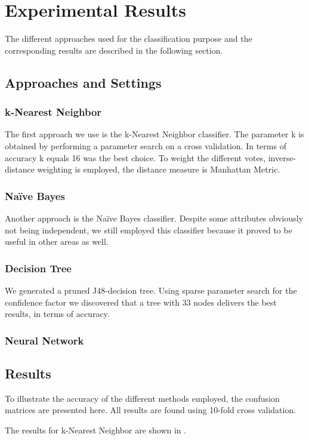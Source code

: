 \section{Experimental Results}
The different approaches used for the classification purpose and the corresponding results are described in the following section. 
\subsection{Approaches and Settings}

\subsubsection*{k-Nearest Neighbor}
The first approach we use is the k-Nearest Neighbor classifier. The parameter k is obtained by performing a parameter search on a cross validation. In terms of accuracy k equals 16 was the best choice. To weight the different votes, inverse-distance weighting is employed, the distance measure is Manhattan Metric. 

\subsubsection*{Na\"ive Bayes}
Another approach is the Na\"ive Bayes classifier. Despite some attributes obviously not being independent, we still employed this classifier because it proved to be useful in other areas as well.  

\subsubsection*{Decision Tree}
We generated a pruned J48-decision tree. Using sparse parameter search for the confidence factor we discovered that a tree with 33 nodes delivers the best results, in terms of accuracy.

\subsubsection{Neural Network}

\subsection{Results}
To illustrate the accuracy of the different methods employed, the confusion matrices are presented here. All results are found using 10-fold cross validation.

The results for k-Nearest Neighbor are shown in .

